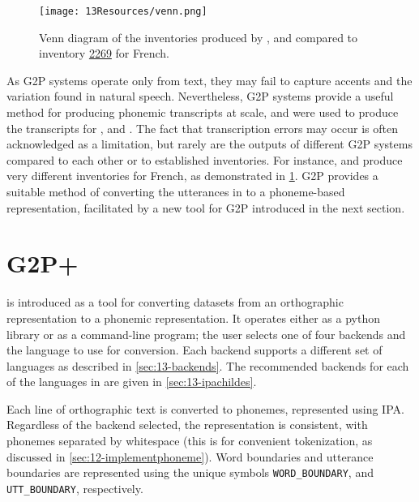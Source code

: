 \begin{figure}[t]
    \centering
    \texttt{[image: 13Resources/venn.png]}
    \caption{Venn diagram of the inventories produced by \phonemizer, \epitran and \gpp compared to \phoible inventory \href{https://phoible.org/inventories/view/2269}{2269} for French.}
    \label{fig:13-venn}
\end{figure}

As G2P systems operate only from text, they may fail to capture accents and the variation found in natural speech. Nevertheless, G2P systems provide a useful method for producing phonemic transcripts at scale, and were used to produce the transcripts for ,  and . The fact that transcription errors may occur is often acknowledged as a limitation, but rarely are the outputs of different G2P systems compared to each other or to established inventories. For instance, \epitran and \phonemizer produce very different inventories for French, as demonstrated in \cref{fig:13-venn}. G2P provides a suitable method of converting the utterances in \childes to a phoneme-based representation, facilitated by a new tool for G2P introduced in the next section.


\section{G2P+}

\gpp is introduced as a tool for converting datasets from an orthographic representation to a phonemic representation. It operates either as a python library or as a command-line program; the user selects one of four backends and the language to use for conversion. Each backend supports a different set of languages as described in \cref{sec:13-backends}. The recommended backends for each of the languages in \ipachildes are given in \cref{sec:13-ipachildes}.

Each line of orthographic text is converted to phonemes, represented using IPA. Regardless of the backend selected, the representation is consistent, with phonemes separated by whitespace (this is for convenient tokenization, as discussed in \cref{sec:12-implementphoneme}). Word boundaries and utterance boundaries are represented using the unique symbols \texttt{WORD\_BOUNDARY}, and \texttt{UTT\_BOUNDARY}, respectively. 

